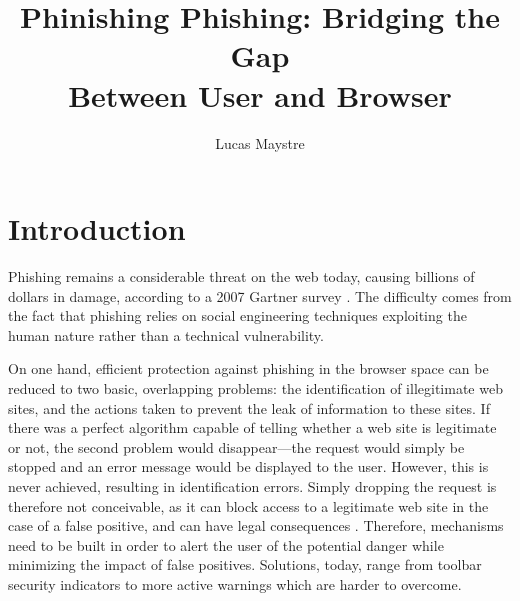 \documentclass[11pt,styles/chicago,a4paper]{article}
\title{Phinishing Phishing: Bridging the Gap \\ Between User and Browser}
\author{Lucas Maystre}
\begin{document}
\maketitle




\section{Introduction} %

Phishing remains a considerable threat on the web today, causing billions of dollars in damage, according to a 2007 Gartner survey \cite{gartnersurvey}. The difficulty comes from the fact that phishing relies on social engineering techniques exploiting the human nature rather than a technical vulnerability.

On one hand, efficient protection against phishing in the browser space can be reduced to two basic, overlapping problems: the identification of illegitimate web sites, and the actions taken to prevent the leak of information to these sites. If there was a perfect algorithm capable of telling whether a web site is legitimate or not, the second problem would disappear---the request would simply be stopped and an error message would be displayed to the user. However, this is never achieved, resulting in identification errors. Simply dropping the request is therefore not conceivable, as it can block access to a legitimate web site in the case of a false positive, and can have legal consequences \cite{sheng2009improving}. Therefore, mechanisms need to be built in order to alert the user of the potential danger while minimizing the impact of false positives. Solutions, today, range from toolbar security indicators to more active warnings which are harder to overcome.
\end{document}
